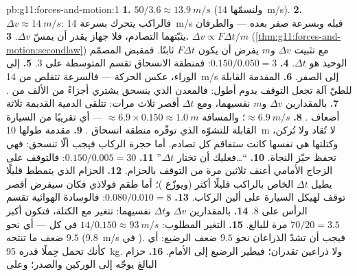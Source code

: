 \begin{solution}{pb:g11:forces-and-motion:1}
\textbf{1.} $50/3.6 \approx \qty{13.9}{m/s}$ (ولنسمّها \qty{14}{m/s}).
\textbf{2.} $\Delta v \approx \qty{14}{m/s}$: فالراكب يتحرك بسرعة
\qty{14}{m/s} قبله وبسرعة صفر بعده --- والطرفان يثبّتهما
التصادم، فلا جهاز يقدر أن يمسّ $\Delta v$.
\textbf{3.} $\Delta v \propto F\Delta t/m$
(\cref{thm:g11:forces-and-motion:secondlaw}) مع تثبيت $\Delta v$ و$m$
يفرض أن يكون $F\Delta t$ ثابتًا. فمقبض المصمّم الوحيد هو
$\Delta t$.
\textbf{4.} $0.150/0.050 = 3$: فمنطقة الانسحاق تقسم 
المتوسطة على $3$.
\textbf{5.} إلى الوراء، عكس الحركة --- فالسرعة تتقلص من
\qty{14}{m/s} إلى الصفر.
\textbf{6.} المقدمة القابلة للطيّ آلة تجعل التوقف يدوم
أطول: فالمعدن الذي ينسحق يشتري أجزاءً من الألف من .
\textbf{7.} بالمقدارين $\Delta v$ و$m$ نفسيهما، ومع $\Delta t$ أقصر ثلاث مرات:
تتلقى الدمية القديمة ثلاثة أضعاف .
\textbf{8.}  $\approx \qty{6.9}{m/s}$؛ والمسافة $\approx
6.9 \times 0.150 \approx \qty{1.0}{m}$ --- أي تقريبًا  من
السيارة القابلة للتشوّه الذي توفّره منطقة انسحاق .
\textbf{9.} مقدمة طولها \qty{10}{m} لا تُقاد ولا تُركن، وكتلتها
هي نفسها كانت ستفاقم كل تصادم. أما حجرة الركاب فيجب ألّا
تنسحق: فهي تحفظ حيّز النجاة.
\textbf{10.} ``\dots فعليك أن تختار $\Delta t$.''
\textbf{11.} $0.150/0.005 = 30$: فالتوقف على الزجاج الأمامي أعنف
ثلاثين مرة من التوقف بالحزام.
\textbf{12.} الحزام الذي يتمطط قليلًا يطيل $\Delta t$ الخاص بالراكب
قليلًا أكثر (ويوزّع )؛ أما طقم فولاذي
فكان سيفرض أقصر توقف لهيكل السيارة على ألين الركاب.
\textbf{13.} $0.080/0.010 = 8$: فالوسادة الهوائية تقسم  الرأس على
$8$.
\textbf{14.} بالمقدارين $\Delta v$ و$\Delta t$ نفسيهما: تتغير  مع
الكتلة، فتكون أكبر $70/20 = 3.5$ مرة للبالغ.
\textbf{15.} التغير المطلوب: $14/0.150 \approx \qty{93}{m/s}$ في كل
 --- أي نحو $9.5$ ضعف ما تنتجه 
(\qty{9.8}{m/s} في ). فيجب أن تشدّ الذراعان نحو $9.5$ ضعف
 الرضيع: أي كأنك تحمل حِملًا قدره \qty{95}{kg}. ولا ذراعين تقدران؛ فيطير الرضيع
إلى الأمام.
\textbf{16.} حزام البالغ يوجّه  إلى الوركين والصدر؛ وعلى

\end{solution}
